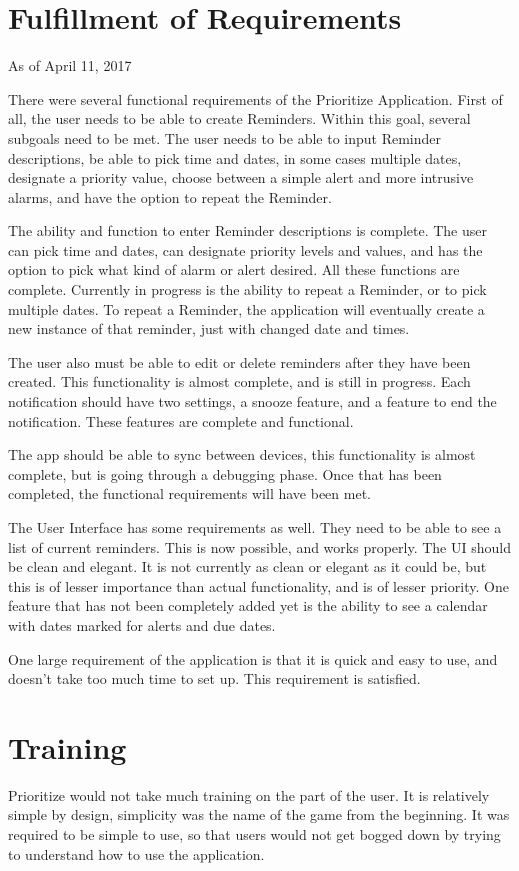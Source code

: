 \documentclass[12pt]{article}
\begin{document}
\section{Fulfillment of Requirements}
As of April 11, 2017

There were several functional requirements of the Prioritize Application. First of all, the user needs to be able to create Reminders. Within this goal, several subgoals need to be met. The user needs to be able to input Reminder descriptions, be able to pick time and dates, in some cases multiple dates, designate a priority value, choose between a simple alert and more intrusive alarms, and have the option to repeat the Reminder. 

The ability and function to enter Reminder descriptions is complete. The user can pick time and dates, can designate priority levels and values, and has the option to pick what kind of alarm or alert desired. All these functions are complete. 
Currently in progress is the ability to repeat a Reminder, or to pick multiple dates. To repeat a Reminder, the application will eventually create a new instance of that reminder, just with changed date and times.  

The user also must be able to edit or delete reminders after they have been created. This functionality is almost complete, and is still in progress. 
Each notification should have two settings, a snooze feature, and a feature to end the notification. These features are complete and functional.

The app should be able to sync between devices, this functionality is almost complete, but is going through a debugging phase. Once that has been completed, the functional requirements will have been met.

The User Interface has some requirements as well. They need to be able to see a list of current reminders. This is now possible, and works properly. The UI should be clean and elegant. It is not currently as clean or elegant as it could be, but this is of lesser importance than actual functionality, and is of lesser priority. One feature that has not been completely added yet is the ability to see a calendar with dates marked for alerts and due dates. 

One large requirement of the application is that it is quick and easy to use, and doesn’t take too much time to set up. This requirement is satisfied. 


\section{Training}
Prioritize would not take much training on the part of the user. It is relatively simple by design, simplicity was the name of the game from the beginning. It was required to be simple to use, so that users would not get bogged down by trying to understand how to use the application.
\end{document}
